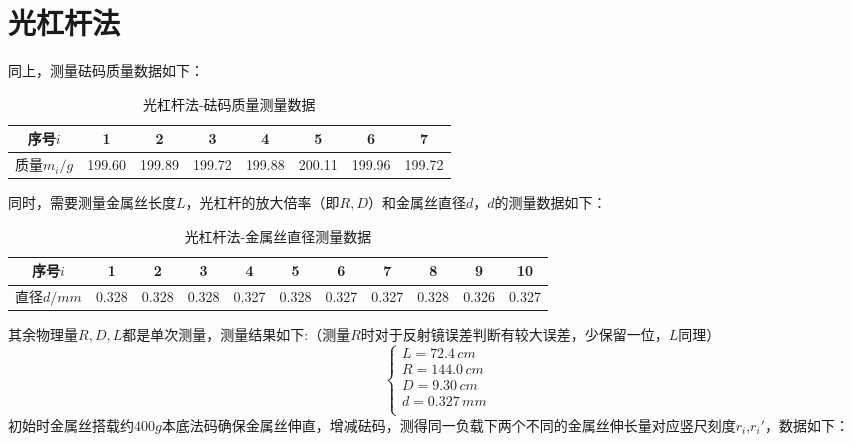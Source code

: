 \documentclass[12pt]{article}
\begin{document}
\section{光杠杆法}
\quad 同上，测量砝码质量数据如下：\\
\begin{table}[H]
    \centering
    \begin{tabular}{cccccccc}
    序号$i$   & 1      & 2      & 3      & 4      & 5      & 6      & 7      \\ \hline
    质量$m_i/g$ & 199.60 & 199.89 & 199.72 & 199.88 & 200.11 & 199.96 & 199.72
    \end{tabular}
    \caption{光杠杆法-砝码质量测量数据}
\end{table}
同时，需要测量金属丝长度$L$，光杠杆的放大倍率（即$R,D$）和金属丝直径$d$，$d$的测量数据如下：\\
\begin{table}[H]
    \centering
    \begin{tabular}{ccccccccccc}
    序号$i$   & 1      & 2      & 3      & 4      & 5      & 6     & 7     & 8     & 9     & 10    \\ \hline
    直径$d/mm$ & 0.328 & 0.328 & 0.328 & 0.327 & 0.328 & 0.327 & 0.327 & 0.328 & 0.326 & 0.327 \\
    \end{tabular}
    \caption{光杠杆法-金属丝直径测量数据}
\end{table}
其余物理量$R,D,L$都是单次测量，测量结果如下:（测量$R$时对于反射镜误差判断有较大误差，少保留一位，$L$同理）\\
\begin{equation*}
\begin{cases}
    L=72.4\,cm \\
    R=144.0\,cm \\
    D=9.30\,cm  \\
    d=0.327\,mm \\
\end{cases}
\end{equation*}
\quad 初始时金属丝搭载约$400g$本底法码确保金属丝伸直，增减砝码，测得同一负载下两个不同的金属丝伸长量对应竖尺刻度$r_i$,$r_i'$，数据如下：\\
\par 
\end{document}
